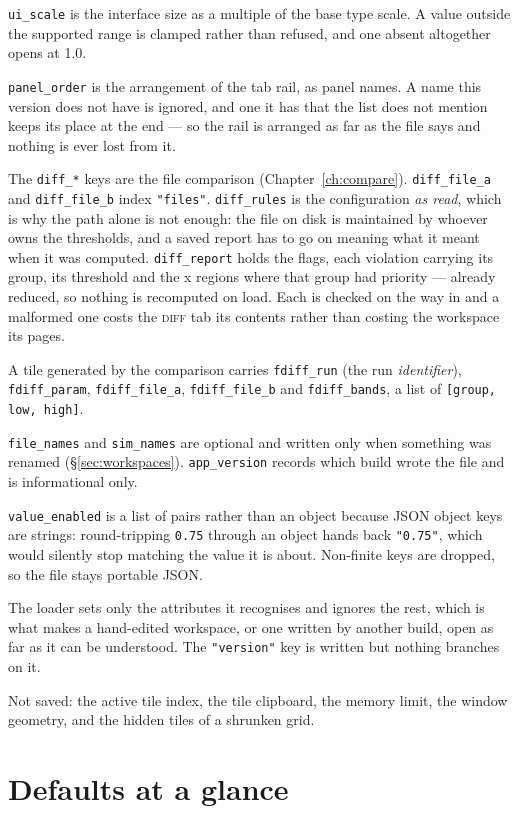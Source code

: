 \documentclass[11pt,a4paper,oneside]{report}
\newcommand{\code}[1]{\texttt{#1}}
\newcommand{\tab}[1]{\textsc{#1}}
\begin{document}
\code{ui\_scale} is the interface size as a multiple of the base type scale. A
value outside the supported range is clamped rather than refused, and one
absent altogether opens at 1.0.

\code{panel\_order} is the arrangement of the tab rail, as panel names. A name
this version does not have is ignored, and one it has that the list does not
mention keeps its place at the end --- so the rail is arranged as far as the
file says and nothing is ever lost from it.

The \code{diff\_*} keys are the file comparison (Chapter~\ref{ch:compare}).
\code{diff\_file\_a} and \code{diff\_file\_b} index \code{"files"}.
\code{diff\_rules} is the configuration \emph{as read}, which is why the path
alone is not enough: the file on disk is maintained by whoever owns the
thresholds, and a saved report has to go on meaning what it meant when it was
computed. \code{diff\_report} holds the flags, each violation carrying its
group, its threshold and the x regions where that group had priority ---
already reduced, so nothing is recomputed on load. Each is checked on the way
in and a malformed one costs the \tab{diff} tab its contents rather than
costing the workspace its pages.

A tile generated by the comparison carries \code{fdiff\_run} (the run
\emph{identifier}), \code{fdiff\_param}, \code{fdiff\_file\_a},
\code{fdiff\_file\_b} and \code{fdiff\_bands}, a list of
\code{[group, low, high]}.

\code{file\_names} and \code{sim\_names} are optional and written only when
something was renamed (\S\ref{sec:workspaces}). \code{app\_version} records
which build wrote the file and is informational only.

\code{value\_enabled} is a list of pairs rather than an object because JSON
object keys are strings: round-tripping \code{0.75} through an object hands back
\code{"0.75"}, which would silently stop matching the value it is about.
Non-finite keys are dropped, so the file stays portable JSON.

The loader sets only the attributes it recognises and ignores the rest, which
is what makes a hand-edited workspace, or one written by another build, open as
far as it can be understood. The \code{"version"} key is written but nothing
branches on it.

Not saved: the active tile index, the tile clipboard, the memory limit, the
window geometry, and the hidden tiles of a shrunken grid.

\chapter{Defaults at a glance}
\end{document}
